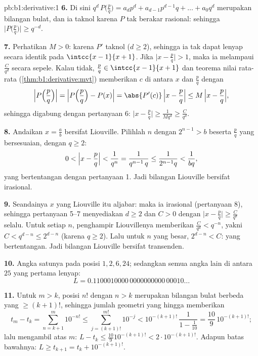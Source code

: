 \begin{solution}{pb:b1:derivative:1}
\textbf{6.} Di sini $q^d\,P\bigl(\frac pq\bigr) = a_d p^d + a_{d-1}
p^{d-1} q + \dots + a_0 q^d$ merupakan bilangan bulat, dan ia taknol
karena $P$ tak berakar rasional: sehingga $\bigl|P\bigl(\frac
pq\bigr)\bigr| \geq q^{-d}$.

\textbf{7.} Perhatikan $M > 0$: karena $P'$  taknol ($d \geq
2$), sehingga ia tak dapat lenyap secara identik pada
$\intcc{x-1}{x+1}$. Jika $\bigl|x - \frac pq\bigr| > 1$, maka ia
melampaui $\frac{C}{q^d}$ secara sepele. Kalau tidak, $\frac pq \in
\intcc{x-1}{x+1}$ dan teorema nilai rata-rata
(\cref{thm:b1:derivative:mvt}) memberikan $c$ di antara $x$ dan
$\frac pq$ dengan
\[
\Bigl|P\Bigl(\frac pq\Bigr)\Bigr|
= \Bigl|P\Bigl(\frac pq\Bigr) - P(x)\Bigr|
= \abs{P'(c)}\,\Bigl|x - \frac pq\Bigr|
\leq M\,\Bigl|x - \frac pq\Bigr| ,
\]
sehingga digabung dengan pertanyaan 6: $\bigl|x - \frac pq\bigr| \geq
\frac{1}{Mq^d} \geq \frac{C}{q^d}$.

\textbf{8.} Andaikan $x = \frac ab$ bersifat Liouville. Pilihlah $n$ dengan
$2^{n-1} > b$ beserta $\frac pq$ yang bersesuaian, dengan $q \geq 2$:
\[
0 < \Bigl|x - \frac pq\Bigr| < \frac{1}{q^n}
= \frac{1}{q^{n-1}\,q} \leq \frac{1}{2^{n-1} q} <
\frac{1}{bq} ,
\]
yang bertentangan dengan pertanyaan 1. Jadi bilangan Liouville bersifat irasional.

\textbf{9.} Seandainya $x$ yang Liouville itu aljabar: maka ia irasional
(pertanyaan 8), sehingga pertanyaan 5--7 menyediakan $d \geq 2$ dan $C > 0$
dengan $\bigl|x - \frac pq\bigr| \geq \frac{C}{q^d}$ selalu. Untuk
setiap $n$, penghampir Liouvillenya memberikan $\frac{C}{q^d} <
q^{-n}$, yakni $C < q^{d-n} \leq 2^{d-n}$ (karena $q \geq 2$). Lalu untuk
$n$ yang besar, $2^{d-n} < C$: yang bertentangan. Jadi bilangan Liouville bersifat
transenden.

\textbf{10.} Angka satunya pada posisi $1, 2, 6, 24$; sedangkan semua angka lain
di antara $25$ yang pertama lenyap:
\[
L = 0.1100010000\,0000000000\,00010\dots
\]

\textbf{11.} Untuk $m > k$, posisi $n!$ dengan $n > k$ merupakan
bilangan bulat berbeda yang $\geq (k+1)!$, sehingga jumlah geometri yang hingga
memberikan
\[
t_m - t_k = \sum_{n=k+1}^{m} 10^{-n!}
\leq \sum_{j = (k+1)!}^{m!} 10^{-j}
< 10^{-(k+1)!}\,\frac{1}{1 - \frac1{10}}
= \frac{10}{9}\,10^{-(k+1)!} ;
\]
lalu mengambil  atas $m$: $L - t_k \leq
\frac{10}{9}10^{-(k+1)!} < 2\cdot10^{-(k+1)!}$. Adapun batas bawahnya: $L
\geq t_{k+1} = t_k + 10^{-(k+1)!}$.


\end{solution}

